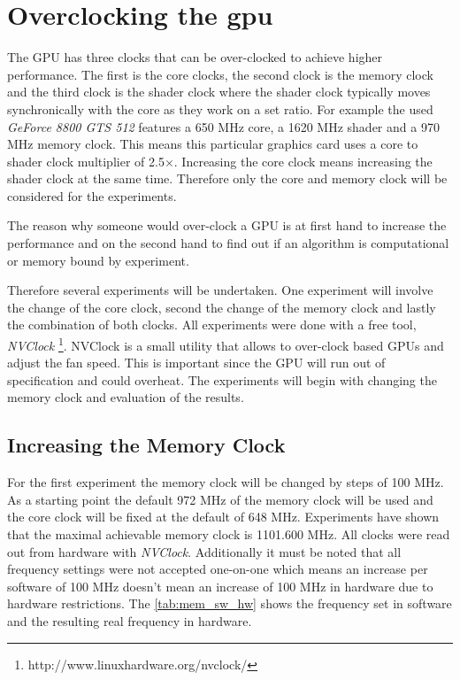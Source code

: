 \section{Overclocking the gpu} %
\label{sec:overclocking_the_gpu}
The \gls{GPU} has three \glspl{clock} that can be over-clocked to achieve higher
performance. The first is the core \glspl{clock}, the second \gls{clock} is
the memory clock and the third clock is the \gls{shader} \gls{clock} where the
shader clock typically moves synchronically with the core as they work on a set
ratio. For example the used \emph{GeForce 8800 GTS 512} features a 650 \gls{MHz}
core, a 1620 \gls{MHz} shader and a 970 \gls{MHz} memory clock. This means this
particular graphics card uses a core to shader \gls{clock} multiplier of
2.5$\times$. Increasing the core \gls{clock} means increasing the shader clock
at the same time. Therefore only the core and memory clock will be considered
for the experiments.

The reason why someone would over-clock a \gls{GPU} is at first hand to increase
the performance and on the second hand to find out if an algorithm is
computational or memory bound by experiment.

Therefore several experiments will be undertaken. One experiment will involve
the change of the core \gls{clock}, second the change of the memory \gls{clock}
and lastly the combination of both \glspl{clock}. All experiments were done with
a free tool, \emph{NVClock}
\footnote{http://www.linuxhardware.org/nvclock/}. NVClock is a small utility
that allows to over-clock {} based \glspl{GPU} and adjust the fan speed. This
is important since the \gls{GPU} will run out of specification and could overheat.
The experiments will begin with changing the memory clock and evaluation of the
results. 


\subsection{Increasing the Memory Clock} %
\label{sub:increasing_the_memory_clcok}
For the first experiment the memory clock will be changed by steps of 100 \gls{MHz}.
As a starting point the default 972 \gls{MHz} of the memory clock will be used 
and the core clock will be fixed at the default of 648 \gls{MHz}. Experiments 
have shown that the maximal achievable memory clock is 1101.600 \gls{MHz}. 
All clocks were read out from hardware with \emph{NVClock}. Additionally it must
be noted that all frequency settings were not accepted one-on-one which means an 
increase per software of 100 \gls{MHz} doesn't mean an increase of 100 \gls{MHz}
in hardware due to hardware restrictions. The \autoref{tab:mem_sw_hw} shows the 
frequency set in software and the resulting real frequency in hardware. 

